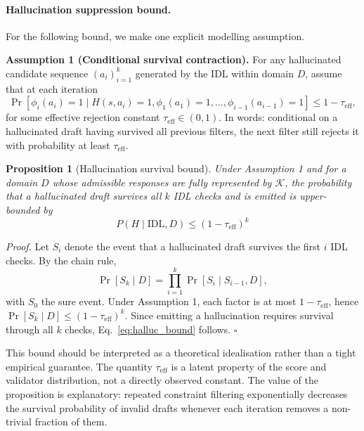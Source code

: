 \documentclass[11pt,a4paper]{article}
\newtheorem{proposition}{Proposition}
\begin{document}
\paragraph{Hallucination suppression bound.}
For the following bound, we make one explicit modelling assumption.

\textbf{Assumption 1 (Conditional survival contraction).}
For any hallucinated candidate sequence $(a_i)_{i=1}^{k}$ generated by the IDL within domain $D$, assume that at each iteration
\[
\Pr[\phi_i(a_i)=1 \mid H(s,a_i)=1,\phi_1(a_1)=1,\dots,\phi_{i-1}(a_{i-1})=1] \le 1-\tau_{\mathrm{eff}},
\]
for some effective rejection constant $\tau_{\mathrm{eff}}\in(0,1)$. In words: conditional on a hallucinated draft having survived all previous filters, the next filter still rejects it with probability at least $\tau_{\mathrm{eff}}$.

\begin{proposition}[Hallucination survival bound]
\label{prop:hallucination}
Under Assumption 1 and for a domain $D$ whose admissible responses are fully represented by $\mathcal{K}$, the probability that a hallucinated draft survives all $k$ IDL checks and is emitted is upper-bounded by
\begin{equation}
  P(H \mid \text{IDL}, D) \leq (1 - \tau_{\mathrm{eff}})^k
  \label{eq:halluc_bound}
\end{equation}
\end{proposition}

\textit{Proof.} Let $S_i$ denote the event that a hallucinated draft survives the first $i$ IDL checks. By the chain rule,
\[
\Pr[S_k \mid D] = \prod_{i=1}^{k}\Pr[S_i \mid S_{i-1}, D],
\]
with $S_0$ the sure event. Under Assumption 1, each factor is at most $1-\tau_{\mathrm{eff}}$, hence $\Pr[S_k \mid D]\le (1-\tau_{\mathrm{eff}})^k$. Since emitting a hallucination requires survival through all $k$ checks, Eq.~\ref{eq:halluc_bound} follows. $\square$

\noindent This bound should be interpreted as a theoretical idealisation rather than a tight empirical guarantee. The quantity $\tau_{\mathrm{eff}}$ is a latent property of the score and validator distribution, not a directly observed constant. The value of the proposition is explanatory: repeated constraint filtering exponentially decreases the survival probability of invalid drafts whenever each iteration removes a non-trivial fraction of them.
\end{document}
